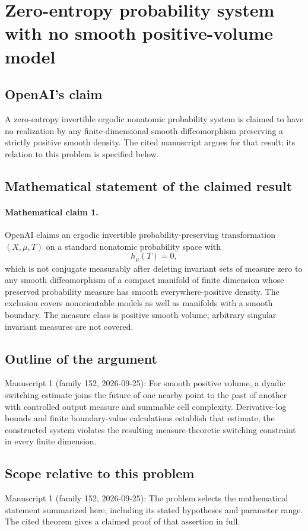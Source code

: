 \documentclass[11pt]{article}
\begin{document}
\section*{Zero-entropy probability system with no smooth positive-volume model}

\subsection{OpenAI's claim}
A zero-entropy invertible ergodic nonatomic probability system is claimed to have no realization by any finite-dimensional smooth diffeomorphism preserving a strictly positive smooth density. The cited manuscript argues for that result; its relation to this problem is specified below.

\subsection{Mathematical statement of the claimed result}
\paragraph{Mathematical claim 1.} OpenAI claims an ergodic invertible probability-preserving transformation $(X,\mu,T)$ on a standard nonatomic probability space with
\[
h_\mu(T)=0,
\]
which is not conjugate measurably after deleting invariant sets of measure zero to any smooth diffeomorphism of a compact manifold of finite dimension whose preserved probability measure has smooth everywhere-positive density. The exclusion covers nonorientable models as well as manifolds with a smooth boundary. The measure class is positive smooth volume; arbitrary singular invariant measures are not covered.

\subsection{Outline of the argument}
Manuscript 1 (family 152, 2026-09-25): For smooth positive volume, a dyadic switching estimate joins the future of one nearby point to the past of another with controlled output measure and summable cell complexity. Derivative-log bounds and finite boundary-value calculations establish that estimate; the constructed system violates the resulting measure-theoretic switching constraint in every finite dimension.

\subsection{Scope relative to this problem}
Manuscript 1 (family 152, 2026-09-25): The problem selects the mathematical statement summarized here, including its stated hypotheses and parameter range. The cited theorem gives a claimed proof of that assertion in full.
\end{document}
